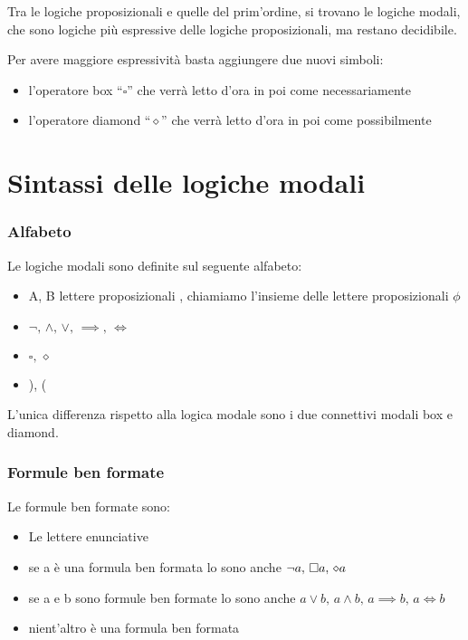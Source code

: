 Tra le logiche proposizionali e quelle del prim'ordine, si trovano
le logiche modali, che sono logiche più espressive delle logiche proposizionali,
ma restano decidibile.

Per avere maggiore espressività basta aggiungere due nuovi simboli:
\begin{itemize}
\item l'operatore box ``$\square$'' che verrà letto d'ora in poi come
necessariamente
\item l'operatore diamond ``$\diamond$'' che verrà letto d'ora in poi
come possibilmente
\end{itemize}

\section{Sintassi delle logiche modali}


\subsubsection*{Alfabeto}

Le logiche modali sono definite sul seguente alfabeto:
\begin{itemize}
\item A, B lettere proposizionali , chiamiamo l'insieme delle lettere proposizionali
$\phi$
\item $\neg,\,\wedge,\,\vee,\,\implies,\,\iff$
\item $\square,\,\diamond$
\item ), (
\end{itemize}
L'unica differenza rispetto alla logica modale sono i due connettivi
modali box e diamond.


\subsubsection*{Formule ben formate}

Le formule ben formate sono:
\begin{itemize}
\item Le lettere enunciative 
\item se a è una formula ben formata lo sono anche $\neg a,\,\square a,\,\diamond a$
\item se a e b sono formule ben formate lo sono anche $a\vee b,\, a\wedge b,\, a\implies b,\, a\iff b$
\item nient'altro è una formula ben formata
\end{itemize}

